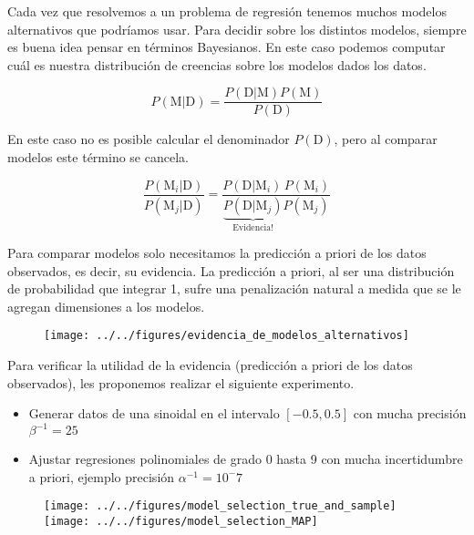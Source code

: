 \documentclass[a4paper,10pt]{article}
\begin{document}
Cada vez que resolvemos a un problema de regresi\'on tenemos muchos modelos alternativos que podr\'iamos usar.
Para decidir sobre los distintos modelos, siempre es buena idea pensar en t\'erminos Bayesianos.
En este caso podemos computar cu\'al es nuestra distribuci\'on de creencias sobre los modelos dados los datos.

\begin{equation*}
 P(\text{M}|\text{D}) = \frac{P(\text{D}|\text{M})P(\text{M})}{ P(\text{D})}
\end{equation*}

En este caso no es posible calcular el denominador $P(\text{D})$, pero al comparar modelos este t\'ermino se cancela.

\begin{equation*}
  \frac{P(\text{M}_i|\text{D})}{P(\text{M}_j|\text{D})}  = \frac{P(\text{D}|\text{M}_i)\,P(\text{M}_i)}{ \underbrace{P(\text{D}|\text{M}_j)}_{\text{Evidencia!}}P(\text{M}_j)}  
\end{equation*}

Para comparar modelos solo necesitamos la predicci\'on a priori de los datos observados, es decir, su evidencia.
La predicci\'on a priori, al ser una distribuci\'on de probabilidad que integrar 1, sufre una penalizaci\'on natural a medida que se le agregan dimensiones a los modelos.

\begin{figure}[H]
\centering
  \texttt{[image: ../../figures/evidencia\_de\_modelos\_alternativos]} 
\end{figure}

Para verificar la utilidad de la evidencia (predicci\'on a priori de los datos observados), les proponemos realizar el siguiente experimento.

\begin{itemize}
  \item Generar datos de una sinoidal en el intervalo $[-0.5,0.5]$ con mucha precisi\'on $\beta^{-1} =25$
 \item Ajustar regresiones polinomiales de grado 0 hasta 9 con mucha incertidumbre a priori, ejemplo precisi\'on $\alpha^{-1}=10^-{7}$
\end{itemize}

\begin{figure}[H]
\centering
 \texttt{[image: ../../figures/model\_selection\_true\_and\_sample]} 
 \texttt{[image: ../../figures/model\_selection\_MAP]} 
\end{figure}
\end{document}
